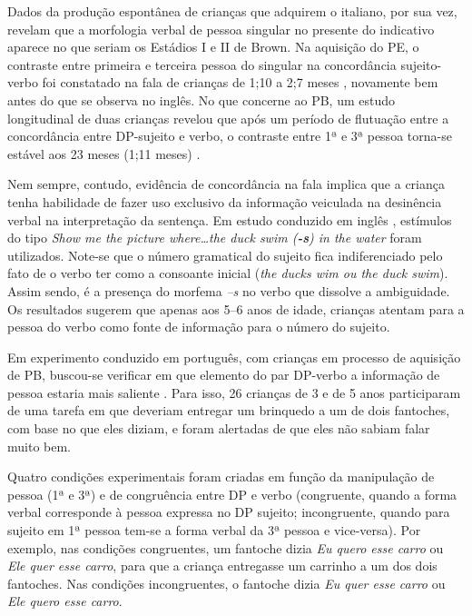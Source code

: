 \documentclass[output=paper]{LSP/langsci}
\begin{document}
Dados da produção espontânea de crianças que adquirem o italiano, por sua vez, revelam que a morfologia verbal de pessoa singular no presente do indicativo aparece no que seriam os Estádios I e II de Brown. Na aquisição do PE, o contraste entre primeira e terceira pessoa do singular na concordância sujeito-verbo foi constatado na fala de crianças de 1;10 a 2;7 meses \citep{goncalves2004}, novamente bem antes do que se observa no inglês. No que concerne ao PB, um estudo longitudinal de duas crianças revelou que após um período de flutuação entre a concordância entre DP-sujeito e verbo, o contraste entre 1ª e 3ª pessoa torna-se estável aos 23 meses (1;11 meses) \citep{martins2007}.

Nem sempre, contudo, evidência de concordância na fala implica que a criança tenha habilidade de fazer uso exclusivo da informação veiculada na desinência verbal na interpretação da sentença. Em estudo conduzido em inglês \citep{johnson_etal2005}, estímulos do tipo \textit{Show me the picture where\ldots the duck swim (\textbf{-s}) in the water} foram utilizados. Note-se que o número gramatical do sujeito fica indiferenciado pelo fato de o verbo ter  como a consoante inicial (\textit{the ducks wim ou the duck swim}). Assim sendo, é a presença do morfema \textit{–s} no verbo que dissolve a ambiguidade. Os resultados sugerem que apenas aos 5--6 anos de idade, crianças atentam para a pessoa do verbo como fonte de informação para o número do sujeito.

Em experimento conduzido em português, com crianças em processo de aquisição de PB, buscou-se verificar em que elemento do par DP-verbo a informação de pessoa estaria mais saliente \citep{martins2007,correamartins2008}. Para isso, 26 crianças de 3 e de 5 anos participaram de uma tarefa em que deveriam entregar um brinquedo a um de dois fantoches, com base no que eles diziam, e foram alertadas de que eles não sabiam falar muito bem. 

Quatro condições experimentais foram criadas em função da manipulação de pessoa (1ª e 3ª) e de congruência entre DP e verbo (congruente, quando a forma verbal corresponde à pessoa expressa no DP sujeito; incongruente, quando para sujeito em 1ª pessoa tem-se a forma verbal da 3ª pessoa e vice-versa). Por exemplo, nas condições congruentes, um fantoche dizia \textit{Eu quero esse carro} ou \textit{Ele quer esse carro}, para que a criança entregasse um carrinho a um dos dois fantoches. Nas condições incongruentes, o fantoche dizia \textit{Eu quer esse carro} ou \textit{Ele quero esse carro}. 
\end{document}
